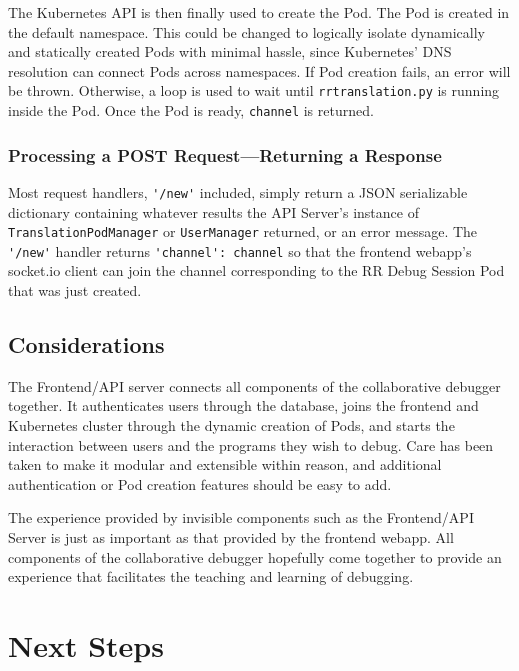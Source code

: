\documentclass[12pt]{article}
\begin{document}
The Kubernetes API is then finally used to create the Pod.  The Pod is
created in the default namespace.  This could be changed to logically
isolate dynamically and statically created Pods with minimal hassle,
since Kubernetes' DNS resolution can connect Pods across namespaces.
If Pod creation fails, an error will be thrown.  Otherwise, a loop is
used to wait until \lstinline{rrtranslation.py} is running inside the
Pod.  Once the Pod is ready, \lstinline{channel} is returned.

\subsubsection{Processing a POST Request---Returning a Response}

Most request handlers, \lstinline{'/new'} included, simply return a
JSON serializable dictionary containing whatever results the API
Server's instance of \lstinline{TranslationPodManager} or
\lstinline{UserManager} returned, or an error message.  The
\lstinline{'/new'} handler returns \lstinline{'channel': channel} so
that the frontend webapp's socket.io client can join the channel
corresponding to the RR Debug Session Pod that was just created.

\subsection{Considerations}

The Frontend/API server connects all components of the collaborative
debugger together.  It authenticates users through the database, joins
the frontend and Kubernetes cluster through the dynamic creation of
Pods, and starts the interaction between users and the programs they
wish to debug.  Care has been taken to make it modular and extensible
within reason, and additional authentication or Pod creation features
should be easy to add.
\par

The experience provided by invisible components such as the
Frontend/API Server is just as important as that provided by the
frontend webapp.  All components of the collaborative debugger
hopefully come together to provide an experience that facilitates the
teaching and learning of debugging.

\section{Next Steps} \label{next}
\end{document}
